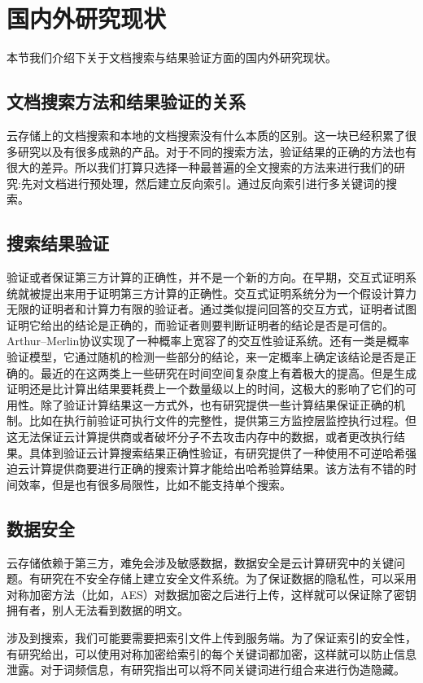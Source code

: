 \section{国内外研究现状}
本节我们介绍下关于文档搜索与结果验证方面的国内外研究现状。

\subsection{文档搜索方法和结果验证的关系}
		云存储上的文档搜索和本地的文档搜索没有什么本质的区别。这一块已经积累了很多研究以及有很多成熟的产品。对于不同的搜索方法，验证结果的正确的方法也有很大的差异。所以我们打算只选择一种最普遍的全文搜索的方法来进行我们的研究:先对文档进行预处理，然后建立反向索引。通过反向索引进行多关键词的搜索。
\subsection{搜索结果验证}
				 验证或者保证第三方计算的正确性，并不是一个新的方向。在早期，交互式证明系统就被提出来用于证明第三方计算的正确性。交互式证明系统分为一个假设计算力无限的证明者和计算力有限的验证者。通过类似提问回答的交互方式，证明者试图证明它给出的结论是正确的，而验证者则要判断证明者的结论是否是可信的。Arthur–Merlin协议实现了一种概率上宽容了的交互性验证系统。还有一类是概率验证模型，它通过随机的检测一些部分的结论，来一定概率上确定该结论是否是正确的。最近的在这两类上一些研究在时间空间复杂度上有着极大的提高。但是生成证明还是比计算出结果要耗费上一个数量级以上的时间，这极大的影响了它们的可用性。除了验证计算结果这一方式外，也有研究提供一些计算结果保证正确的机制。比如在执行前验证可执行文件的完整性，提供第三方监控层监控执行过程。但这无法保证云计算提供商或者破坏分子不去攻击内存中的数据，或者更改执行结果。具体到验证云计算搜索结果正确性验证，有研究提供了一种使用不可逆哈希强迫云计算提供商要进行正确的搜索计算才能给出哈希验算结果。该方法有不错的时间效率，但是也有很多局限性，比如不能支持单个搜索。
\subsection{数据安全}
						云存储依赖于第三方，难免会涉及敏感数据，数据安全是云计算研究中的关键问题。有研究在不安全存储上建立安全文件系统。为了保证数据的隐私性，可以采用对称加密方法（比如，AES）对数据加密之后进行上传，这样就可以保证除了密钥拥有者，别人无法看到数据的明文。

						    涉及到搜索，我们可能要需要把索引文件上传到服务端。为了保证索引的安全性，有研究给出，可以使用对称加密给索引的每个关键词都加密，这样就可以防止信息泄露。对于词频信息，有研究指出可以将不同关键词进行组合来进行伪造隐藏。

